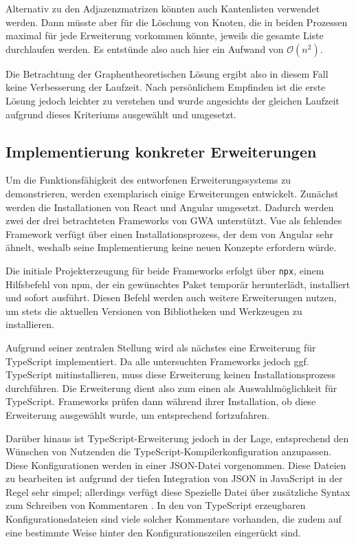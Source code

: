 Alternativ zu den Adjazenzmatrizen könnten auch Kantenlisten verwendet werden. Dann müsste aber für die Löschung von Knoten, die in beiden Prozessen maximal für jede Erweiterung vorkommen könnte, jeweils die gesamte Liste durchlaufen werden. Es entstünde also auch hier ein Aufwand von $\mathcal{O}(n^2)$.

Die Betrachtung der Graphentheoretischen Lösung ergibt also in diesem Fall keine Verbesserung der Laufzeit. Nach persönlichem Empfinden ist die erste Lösung jedoch leichter zu verstehen und wurde angesichts der gleichen Laufzeit aufgrund dieses Kriteriums ausgewählt und umgesetzt.


\subsection{Implementierung konkreter Erweiterungen}
Um die Funktionsfähigkeit des entworfenen Erweiterungssystems zu demonstrieren, werden exemplarisch einige Erweiterungen entwickelt. Zunächst werden die Installationen von React und Angular umgesetzt. Dadurch werden zwei der drei betrachteten Frameworks von \gls{GWA} unterstützt. Vue als fehlendes Framework verfügt über einen Installationsprozess, der dem von Angular sehr ähnelt, weshalb seine Implementierung keine neuen Konzepte erfordern würde.

Die initiale Projekterzeugung für beide Frameworks erfolgt über \verb/npx/, einem Hilfsbefehl von \gls{npm}, der ein gewünschtes Paket temporär herunterlädt, installiert und sofort ausführt. Diesen Befehl werden auch weitere Erweiterungen nutzen, um stets die aktuellen Versionen von Bibliotheken und Werkzeugen zu installieren.

Aufgrund seiner zentralen Stellung wird als nächstes eine Erweiterung für TypeScript implementiert. Da alle untersuchten Frameworks jedoch ggf. TypeScript mitinstallieren, muss diese Erweiterung keinen Installationsprozess durchführen. Die Erweiterung dient also zum einen als Auswahlmöglichkeit für TypeScript. Frameworks prüfen dann während ihrer Installation, ob diese Erweiterung ausgewählt wurde, um entsprechend fortzufahren.

Darüber hinaus ist TypeScript-Erweiterung jedoch in der Lage, entsprechend den Wünschen von Nutzenden die TypeScript-Kompilerkonfiguration anzupassen. Diese Konfigurationen werden in einer \gls{JSON}-Datei vorgenommen. Diese Dateien zu bearbeiten ist aufgrund der tiefen Integration von \gls{JSON} in JavaScript in der Regel sehr simpel; allerdings verfügt diese Spezielle Datei über zusätzliche Syntax zum Schreiben von Kommentaren \cite{JSON_MDN}. In den von TypeScript erzeugbaren Konfigurationsdateien sind viele solcher Kommentare vorhanden, die zudem auf eine bestimmte Weise hinter den Konfigurationszeilen eingerückt sind.

